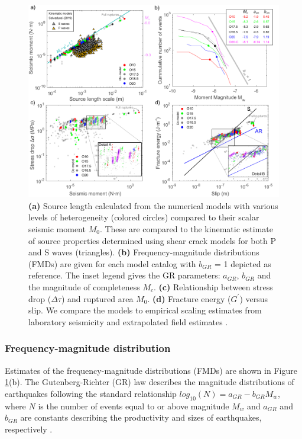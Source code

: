 \documentclass[preprint,1p, 10pt,authoryear]{elsarticle}
\begin{document}
\begin{figure}
	\centering
	\includegraphics[scale = 0.95]{FIG10_revised.pdf} 
	\caption{\textbf{(a)} Source length calculated from the numerical models with various levels of heterogeneity (colored circles) compared to their scalar seismic moment $M_{0}$. These are compared to the kinematic estimate of source properties determined using shear crack models \citet{Selvadurai2019} for both P and S waves (triangles). \textbf{(b)} Frequency-magnitude distributions (FMDs) are given for each model catalog with $b_{GR}$ = 1 depicted as reference. The inset legend gives the GR parameters: $a_{GR}$, $b_{GR}$ and the magnitude of completeness $M_{c}$. \textbf{(c)} Relationship between stress drop ($\Delta\tau$) and ruptured area $M_{0}$. \textbf{(d)} Fracture energy ($G^{'}$) versus slip. We compare the models to empirical scaling estimates from laboratory seismicity \citep[black line,][]{Selvadurai2019} and extrapolated field estimates \citep[blue line][]{Abercrombie2005}.}
	\label{fig10}
\end{figure}

\subsubsection{Frequency-magnitude distribution}
Estimates of the frequency-magnitude distributions (FMDs) are shown in Figure \ref{fig10}(b). The Gutenberg-Richter (GR) law describes the magnitude distributions of earthquakes following the standard relationship $log_{10}(N)= a_{GR} - b_{GR}M_{w}$, where $N$ is the number of events equal to or above magnitude $M_{w}$ and $a_{GR}$ and $b_{GR}$ are constants describing the productivity and sizes of earthquakes, respectively \cite[e.g.][]{Wiemer2002}.  
\end{document}
